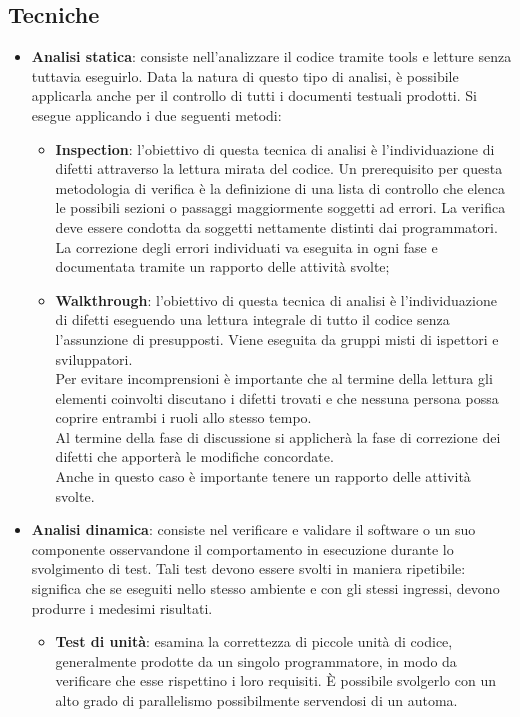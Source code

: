 \subsection {Tecniche}
\begin{itemize}
\item \textbf{Analisi statica}: consiste nell’analizzare il codice tramite tools e letture senza tuttavia eseguirlo. Data la natura di questo tipo di analisi, è possibile applicarla anche per il controllo di tutti i documenti testuali prodotti.
Si esegue applicando i due seguenti metodi:
\begin{itemize}
\item \textbf{Inspection}: l’obiettivo di questa tecnica di analisi è l’individuazione di difetti attraverso la lettura mirata del codice. Un prerequisito per questa metodologia di verifica è la definizione di una lista di controllo che elenca le possibili sezioni o passaggi maggiormente soggetti ad errori. La verifica deve essere condotta da soggetti nettamente distinti dai programmatori. La correzione degli errori individuati va eseguita in ogni fase e documentata tramite un rapporto delle attività svolte;

\item \textbf{Walkthrough}: l'obiettivo di questa tecnica di analisi è l'individuazione di difetti eseguendo una lettura integrale di tutto il codice senza l'assunzione di presupposti. Viene eseguita da gruppi misti di ispettori e sviluppatori. \\
Per evitare incomprensioni è importante che al termine della lettura gli elementi coinvolti discutano i difetti trovati e che nessuna persona possa coprire entrambi i ruoli allo stesso tempo. \\
Al termine della fase di discussione si applicherà la fase di correzione dei difetti che apporterà le modifiche concordate.  \\
Anche in questo caso è importante tenere un rapporto delle attività svolte.
\end{itemize}

\item \textbf{Analisi dinamica}: consiste nel verificare e validare il software o un suo componente osservandone il comportamento in esecuzione durante lo svolgimento di test. Tali test devono essere svolti in maniera ripetibile: significa che se eseguiti nello stesso ambiente e con gli stessi ingressi, devono produrre i medesimi risultati.
\begin{itemize}
\item \textbf{Test di unità}: esamina la correttezza di piccole unità di codice, generalmente prodotte da un singolo programmatore, in modo da verificare che esse rispettino i loro requisiti. È possibile svolgerlo con un alto grado di parallelismo possibilmente servendosi di un automa.


\end{itemize}
\end{itemize}
